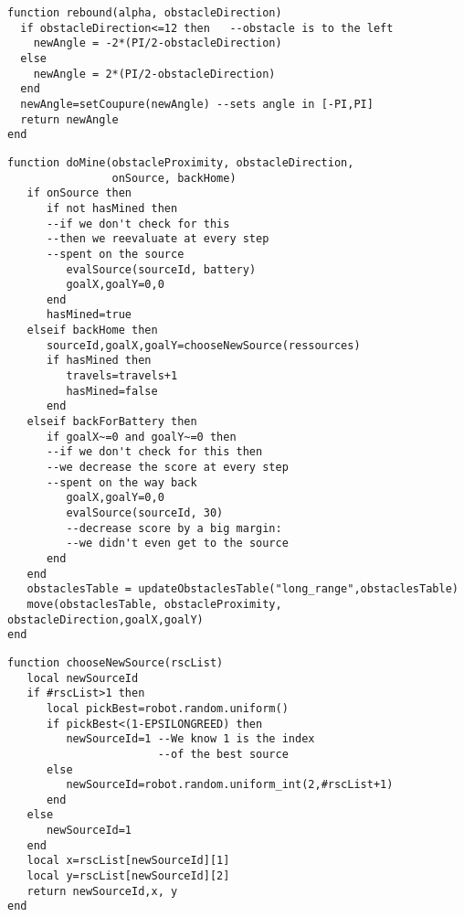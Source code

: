 \begin{subappendices}
\begin{lstlisting}[caption=Calcul de l'angle "réfléchi"]
function rebound(alpha, obstacleDirection)
  if obstacleDirection<=12 then   --obstacle is to the left
    newAngle = -2*(PI/2-obstacleDirection)
  else
    newAngle = 2*(PI/2-obstacleDirection)
  end
  newAngle=setCoupure(newAngle) --sets angle in [-PI,PI]
  return newAngle
end
\end{lstlisting}


\begin{lstlisting}[caption=fonction doMine]
function doMine(obstacleProximity, obstacleDirection,
                onSource, backHome)
   if onSource then
      if not hasMined then
      --if we don't check for this
      --then we reevaluate at every step
      --spent on the source
         evalSource(sourceId, battery)
         goalX,goalY=0,0
      end
      hasMined=true
   elseif backHome then
      sourceId,goalX,goalY=chooseNewSource(ressources)
      if hasMined then
         travels=travels+1
         hasMined=false
      end
   elseif backForBattery then
      if goalX~=0 and goalY~=0 then
      --if we don't check for this then
      --we decrease the score at every step
      --spent on the way back
         goalX,goalY=0,0
         evalSource(sourceId, 30)
         --decrease score by a big margin:
         --we didn't even get to the source
      end
   end
   obstaclesTable = updateObstaclesTable("long_range",obstaclesTable)
   move(obstaclesTable, obstacleProximity, obstacleDirection,goalX,goalY)
end
\end{lstlisting}

\begin{lstlisting}[caption=Choix de la ressource à exploiter]
function chooseNewSource(rscList)
   local newSourceId
   if #rscList>1 then
      local pickBest=robot.random.uniform()
      if pickBest<(1-EPSILONGREED) then
         newSourceId=1 --We know 1 is the index
                       --of the best source
      else
         newSourceId=robot.random.uniform_int(2,#rscList+1)
      end
   else
      newSourceId=1
   end
   local x=rscList[newSourceId][1]
   local y=rscList[newSourceId][2]
   return newSourceId,x, y
end
\end{lstlisting}


\end{subappendices}
